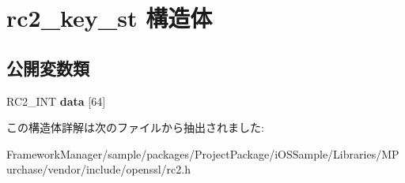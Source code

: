 \hypertarget{structrc2__key__st}{}\section{rc2\+\_\+key\+\_\+st 構造体}
\label{structrc2__key__st}
\subsection*{公開変数類}
\begin{DoxyCompactItemize}
\item 
\hypertarget{structrc2__key__st_a4626a56b45c5ae4d5971705c55eea281}{}R\+C2\+\_\+\+I\+N\+T {\bfseries data} \mbox{[}64\mbox{]}\label{structrc2__key__st_a4626a56b45c5ae4d5971705c55eea281}

\end{DoxyCompactItemize}


この構造体詳解は次のファイルから抽出されました\+:\begin{DoxyCompactItemize}
\item 
Framework\+Manager/sample/packages/\+Project\+Package/i\+O\+S\+Sample/\+Libraries/\+M\+Purchase/vendor/include/openssl/rc2.\+h\end{DoxyCompactItemize}
